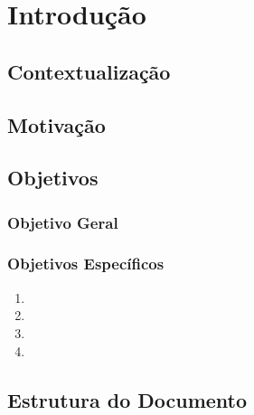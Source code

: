 \documentclass[12pt,a4paper]{article}
\begin{document}
\newpage

\tableofcontents
\newpage

\section{Introdução}

\lipsum[3-5]

\subsection{Contextualização}

\lipsum[6-7]

\subsection{Motivação}

\lipsum[8-9]

\subsection{Objetivos}

\subsubsection{Objetivo Geral}
\lipsum[10]

\subsubsection{Objetivos Específicos}
\begin{enumerate}[label=(\roman*)]
  \item \lipsum[11][1-2]
  \item \lipsum[11][3-4]
  \item \lipsum[11][5-6]
  \item \lipsum[12][1-2]
\end{enumerate}

\subsection{Estrutura do Documento}
\lipsum[13]

\end{document}
